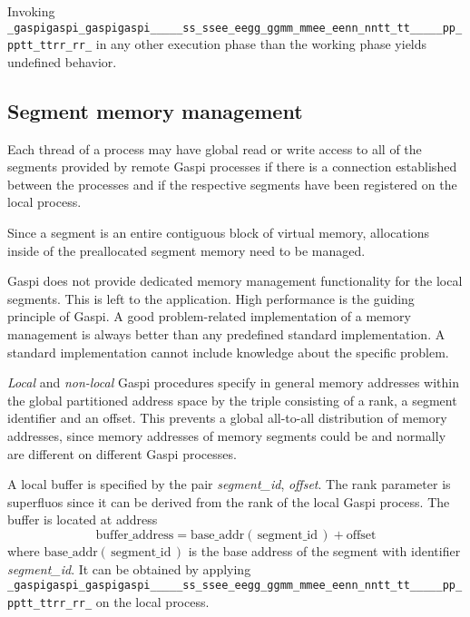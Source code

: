 \documentclass{article}
\makeatletter
\newlength{\lw}\setlength{\lw}{0.4pt}
\newlength{\st}\setlength{\st}{0pt}
\newcommand{\zerowsep}{\hskip 0pt plus 0.1pt minus 0.1pt}
\newcommand{\ZSEP}[1]{\ifx#1\@@@EOZ@@@\let\next\relax\else\ifx#1\_#1\zerowsep\else#1\fi\let\next\ZSEP\fi\next}
\newcommand{\zsep}[1]{\ZSEP{}#1\@@@EOZ@@@}
\newcommand{\gaspiprefix}{gaspi}
\newcommand{\GASPI}{{\sc Gaspi}}
\newcommand{\function}[1]{{\tt #1}}
\newcommand{\parameter}[1]{{\it #1}}
\newcommand{\gaspifunction}[1]{\function{\protect\zsep{\gaspiprefix\_#1}}}
\newcommand{\gaspisemantic}[1]{{\emph{#1}}}
\makeatother
\begin{document}
Invoking \gaspifunction{segment\_ptr} in any other execution phase than the
working phase yields undefined behavior.

\subsection{Segment memory management}

Each thread of a  process may have global read or write access to all of
the segments provided by remote \GASPI{} processes if there
is a connection established between the processes and if the
respective segments have been registered on the local process.

Since a segment is an entire contiguous block of virtual memory,
allocations inside of the preallocated segment memory need to be
managed.

\GASPI{} does not provide dedicated memory management functionality
for the local segments. This is left to the application.
High performance is the guiding principle of \GASPI{}.
A good problem-related implementation of a memory management is always better
than any predefined standard implementation. A standard implementation cannot
include knowledge about the specific problem.

\gaspisemantic{Local} and \gaspisemantic{non-local} \GASPI{} procedures
specify in general memory addresses within the global partitioned address space by
the triple consisting of a rank, a segment identifier and
an offset.  This prevents a global all-to-all distribution of memory
addresses, since memory addresses of memory segments could be and
normally are different on different \GASPI{} processes.

A local buffer is specified by the pair \parameter{segment\_id}, \parameter{offset}.
The rank parameter is superfluos since it can be derived from the rank of the local \GASPI{} process.
The buffer  is located at address
\begin{equation}
\mbox{buffer\_address} = \mbox{base\_addr}\left(\, \mbox{segment\_id} \,\right) + \mbox{offset} \nonumber
\end{equation}
where $\mbox{base\_addr}(\, \mbox{segment\_id} \,)$ is the base address of the segment with identifier
\parameter{segment\_id}.
It can be obtained by applying \gaspifunction{segment\_ptr} on the local process.
\end{document}
